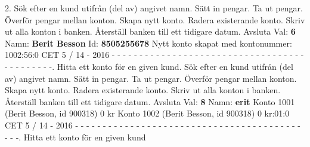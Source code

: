 2.   Sök efter en kund utifrån (del av) angivet namn.   Sätt in pengar.   Ta ut pengar.   Överför pengar mellan konton.   Skapa nytt konto.   Radera existerande konto.   Skriv ut alla konton i banken.   Återställ banken till ett tidigare datum. Avsluta\newline
Val: \textbf{6}\newline
Namn: \textbf{Berit Besson}\newline
Id: \textbf{8505255678}\newline
Nytt konto skapat med kontonummer: 1002:56:0 CET 5 / 14 - 2016\newline
\newline
- - - - - - - - - - - - - - - - - - - - - - - - - - - - - - - - - - - - - - - - - - - -.   Hitta ett konto för en given kund.   Sök efter en kund utifrån (del av) angivet namn.   Sätt in pengar.   Ta ut pengar.   Överför pengar mellan konton.   Skapa nytt konto.   Radera existerande konto.   Skriv ut alla konton i banken.   Återställ banken till ett tidigare datum. Avsluta\newline
Val: \textbf{8}\newline
Namn: \textbf{erit}
Konto 1001 (Berit Besson, id 900318) 0 kr\newline
Konto 1002 (Berit Besson, id 900318) 0 kr:01:0 CET 5 / 14 - 2016\newline
- - - - - - - - - - - - - - - - - - - - - - - - - - - - - - - - - - - - - - - - - - - -.   Hitta ett konto för en given kund\newline
